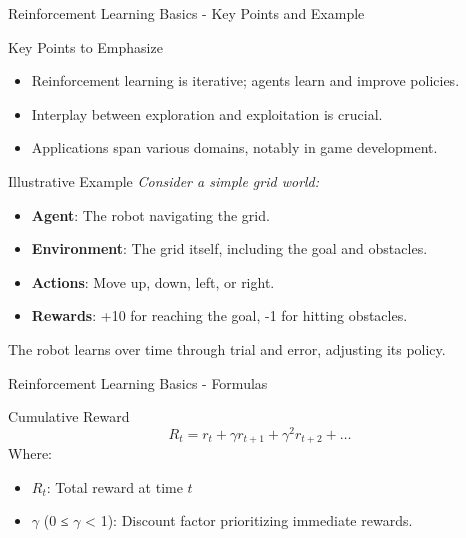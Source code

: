 \documentclass[aspectratio=169]{beamer}
\begin{document}
\begin{frame}[fragile]{Reinforcement Learning Basics - Key Points and Example}
    \begin{block}{Key Points to Emphasize}
        \begin{itemize}
            \item Reinforcement learning is iterative; agents learn and improve policies.
            \item Interplay between exploration and exploitation is crucial.
            \item Applications span various domains, notably in game development.
        \end{itemize}
    \end{block}

    \begin{block}{Illustrative Example}
        \textit{Consider a simple grid world:}
        \begin{itemize}
            \item \textbf{Agent}: The robot navigating the grid.
            \item \textbf{Environment}: The grid itself, including the goal and obstacles.
            \item \textbf{Actions}: Move up, down, left, or right.
            \item \textbf{Rewards}: +10 for reaching the goal, -1 for hitting obstacles.
        \end{itemize}
        The robot learns over time through trial and error, adjusting its policy.
    \end{block}
\end{frame}

\begin{frame}[fragile]{Reinforcement Learning Basics - Formulas}
    \begin{block}{Cumulative Reward}
        \begin{equation}
        R_t = r_t + \gamma r_{t+1} + \gamma^2 r_{t+2} + \ldots
        \end{equation}
        Where:
        \begin{itemize}
            \item \( R_t \): Total reward at time \( t \)
            \item \( \gamma \) (0 ≤ \( \gamma \) < 1): Discount factor prioritizing immediate rewards.
        \end{itemize}
    \end{block}
\end{frame}
\end{document}

